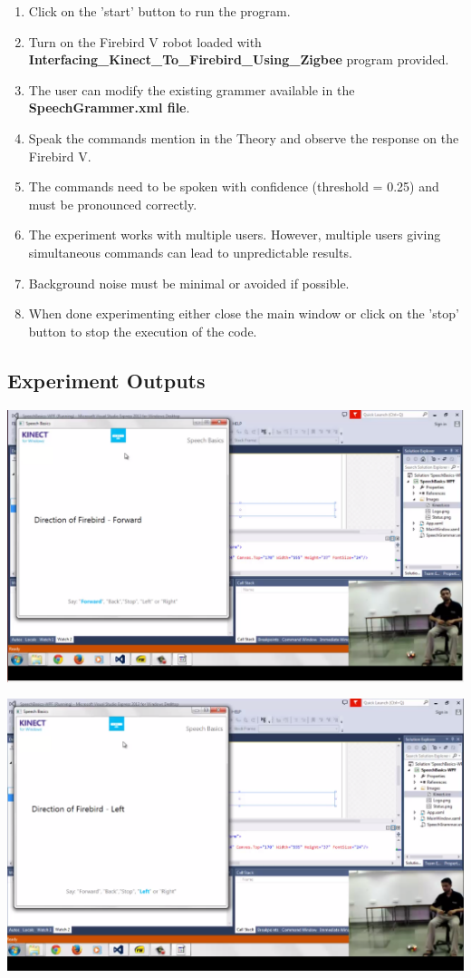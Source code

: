 \begin{flushleft}
\begin{enumerate}
\item Click on the 'start' button to run the program.
\item Turn on the Firebird V robot loaded with \textbf{Interfacing\_Kinect\_To\_Firebird\_Using\_Zigbee} program provided.
\item The user can modify the existing grammer available in the \textbf{SpeechGrammer.xml file}.
\item Speak the commands mention in the Theory and observe the response on the Firebird V.
\item The commands need to be spoken with confidence (threshold = 0.25) and must be pronounced correctly.
\item The experiment works with multiple users. However, multiple users giving simultaneous commands can lead to unpredictable results.
\item Background noise must be minimal or avoided if possible. 
\item When done experimenting either close the main window or click on the 'stop' button to stop the execution of the code.
\medskip
\end{enumerate}
\subsection{\textbf{ Experiment Outputs}}
\includegraphics[scale = 0.5]{e101}

\medskip
\includegraphics[scale = 0.5]{e102}
\medskip

\end{flushleft}
